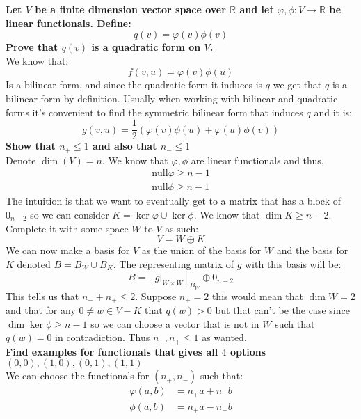 \documentclass[11pt,a4paper]{article}
\theoremstyle{plain}
\newcommand{\R}{\mathbb{R}}
\begin{document}
	\newpage
	\noindent
	\textbf{Let $V$ be a finite dimension vector space over $\R$ and let
	$\varphi,\phi \colon V \to \R$ be linear functionals. Define:
	\[
		q(v) = \varphi(v)\phi(v)
	\]
	Prove that $q(v)$ is a quadratic form on $V$.} \\
	We know that:
	\[
		f(v,u) = \varphi(v)\phi(u)
	\]
	Is a bilinear form, and since the quadratic form it induces is $q$ we get
	that $q$ is a bilinear form by definition. Usually when working with
	bilinear and quadratic forms it's convenient to find the symmetric bilinear
	form that induces $q$ and it is:
	\[
		g(v,u) = \frac 12 \left(\varphi(v)\phi(u) + \varphi(u)\phi(v)\right)
	\]
	\textbf{Show that $n_+ \le 1$ and also that $n_- \le 1$} \\
	Denote $\dim(V) = n$. We know that $\varphi,\phi$ are linear functionals
	and thus, 
	\begin{align*}
		\mathrm{null} \varphi \geq n - 1 \\
		\mathrm{null} \phi \geq n - 1
	\end{align*}
	The intuition is that we want to eventually get to a matrix that has a 
	block of $0_{n-2}$ so we can consider $K = \ker \varphi \cup \ker \phi$. 
	We know that $\dim K \geq n - 2$. Complete it with some space $W$ to $V$ 
	as such:
	\[
		V = W \oplus K
	\]
	We can now make a basis for $V$ as the union of the basis for $W$ and the
	basis for $K$ denoted $B= B_W \cup B_K$. The representing matrix of $g$
	with this basis will be:
	\[
		B = [g|_{W \times W}]_{B_W} \oplus 0_{n - 2}
	\]
	This tells us that $n_- + n_+ \le 2$. Suppose $n_+ = 2$ this would mean
	that $\dim W = 2$ and that for any $0 \neq w\in V - K$ that $q(w) > 0$
	but that can't be the case since $\dim \ker \phi \geq n-1$ so we can
	choose a vector that is not in $W$ such that $q(w) = 0$ in contradiction.
	Thus $n_-,n_+ \le 1$ as wanted. \\
	\textbf{Find examples for functionals that gives all $4$ options $(0,0),
	(1,0),(0,1),(1,1)$} \\
	We can choose the functionals for $(n_+,n_-)$ such that:
	\begin{align*}
		\varphi(a,b) &= n_+a + n_-b \\
		\phi(a,b) &= n_+a - n_-b
	\end{align*}
	
	
	
	
\end{document}
